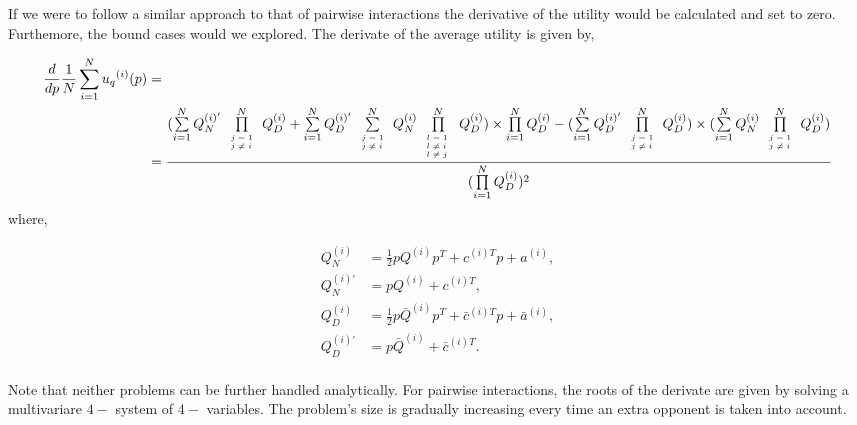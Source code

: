 \documentclass[10pt]{article}
\begin{document}
If we were to follow a similar approach to that of pairwise interactions the derivative
of the utility would be calculated and set to zero. Furthemore, the bound cases would
we explored. The derivate of the average utility is given by,

{\scriptsize
\begin{align*}
    \frac{d}{dp} \frac{1}{N} \sum\limits_{i=1} ^ {N} {u_q}^{(i)} (p) & = \\
    & =\frac{
    (\sum\limits_{i=1} ^ {N} Q_{N}^{(i)'} \prod\limits_{\tiny\begin{array}{l} j=1 \\ j \neq i \end{array}} ^ N Q_{D}^{(i)}
    + \sum\limits_{i=1} ^ {N} Q_{D}^{(i)'} \sum\limits_{\tiny\begin{array}{l} j=1 \\ j \neq i \end{array}} ^ {N} Q_{N}^{(i)}
    \prod\limits_{\tiny\begin{array}{l} l=1 \\ l \neq i \ \\ l \neq j \end{array}} ^ N Q_{D}^{(i)}) \times
    \prod\limits_{i=1} ^ N Q_{D}^{(i)} - (\sum\limits_{i=1} ^ {N} Q_{D}^{(i)'}
    \prod\limits_{\tiny\begin{array}{l} j=1 \\ j \neq i \end{array}} ^ N Q_{D}^{(i)}) \times 
    (\sum\limits_{i=1} ^ {N} Q_{N}^{(i)} \prod\limits_{\tiny\begin{array}{l} j=1 \\ j \neq i \end{array}} ^ N Q_{D}^{(i)})}
    {(\prod\limits_{i=1} ^ N Q_{D}^{(i)})^{2}}
\end{align*}
}
where,

\begin{align*}
    Q_{N}^{(i) } & = \frac{1}{2} pQ^{(i)} p^T + c^{(i)T} p + a^ {(i)}, \\
    Q_{N}^{(i)'} & =  pQ^{(i)} + c^{(i)T}, \\
    Q_{D}^{(i) } & = \frac{1}{2} p\bar{Q}^{(i)} p^T + \bar{c}^{(i)T} p + \bar{a}^ {(i)}, \\
    Q_{D}^{(i)'} & =  p\bar{Q}^{(i)} + \bar{c}^{(i)T}. \\
\end{align*}

Note that neither problems can be further handled analytically. For pairwise
interactions, the roots of the derivate are given by solving a multivariare \(4-\)
system of \(4-\) variables. The problem's size is gradually increasing every time
an extra opponent is taken into account.
\end{document}
